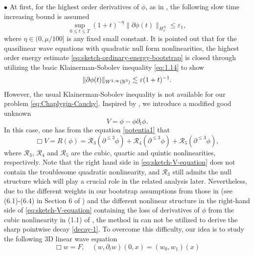 \documentclass[11pt,twoside]{article}
\def\R{\mathop{\mathbb R\kern 0pt}\nolimits}
\def\p{\partial}
\theoremstyle{plain}
\theoremstyle{definition}
\theoremstyle{assumption}
\numberwithin{equation}{section}
\begin{document}
 $\bullet$ At first,  for the highest order derivatives of $\phi$, as in \cite{Alinhac1}, the following slow time increasing bound is assumed
		\begin{equation}
		\label{eq:sketch-ordinary-energy-bootstrap}
		\sup_{0\le t\le T}
		(1+t)^{-\eta}
		\|\partial\phi(t)\|_{H^N_x}
		\le
		\varepsilon_1,
	\end{equation}
where $\eta\in(0,\mu/100]$ is any fixed small constant. It is pointed out that for the
quasilinear wave equations with quadratic null form nonlinearities, the highest order energy estimate
\eqref{eq:sketch-ordinary-energy-bootstrap} is closed through utilizing the basic Klainerman-Sobolev inequality \eqref{eq:1.14}
to show
	\begin{equation}\label{decay-1}
	\|\partial\phi(t)\|_{W^{2,\infty}(\R^3)}
	\lesssim
	\varepsilon(1+t)^{-1}.
	\end{equation}
	However, the usual 	Klainerman-Sobolev inequality  is not available for our problem \eqref{eq:Chaplygin-Cauchy}.
	Inspired by \cite{HouTaoYin2}, we introduce a modified good unknown
	\begin{equation}\label{eq:sketch-V-definition}
		V=\phi-\phi\partial_t\phi.
	\end{equation}
	In this case, one has  from the equation \eqref{potentia1} that
\begin{equation}\label{eq:sketch-V-equation}
	\Box V= R(\phi)=\mathcal R_3(\p^{\le3}\phi)+\mathcal R_4(\p^{\le3}\phi)+\mathcal R_5(\p^{\le3}\phi),
	\end{equation}
	where $\mathcal R_3$, $\mathcal R_4$ and $\mathcal R_5$ are the cubic,
quartic and quintic nonlinearities, respectively. Note that the right hand side in \eqref{eq:sketch-V-equation} does not contain
the troublesome quadratic nonlinearity, and $\mathcal R_3$ still admits the null structure which will play a crucial role in the related analysis
later. Nevertheless,
due to the different weights in our bootstrap assumptions from those in \cite{GaoLiYin2026} (see (6.1)-(6.4) in Section 6 of \cite{GaoLiYin2026})
and the different nonlinear structure in the right-hand side of \eqref{eq:sketch-V-equation} containing the loss of derivatives of $\phi$ from the cubic nonlinearity in (1.1) of \cite{GaoLiYin2026},
the method in \cite{GaoLiYin2026} can not be utilized to derive the sharp pointwise decay \eqref{decay-1}.
To overcome this difficulty, our idea is to study the following 3D linear wave equation
\begin{equation}\label{YHC-5}
\Box w=F, \quad (w,\partial_t w)(0,x)=(w_0,w_1)(x)
\end{equation}
\end{document}
